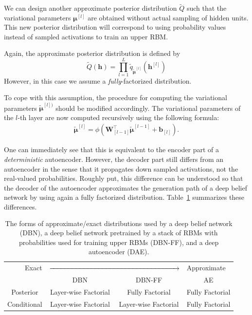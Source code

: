 \documentclass[dissertation,nocontribution,draft*]{aaltoseries}
\newcommand{\qlay}[1]{\left[#1\right]}
\newcommand{\vect}[1]{\mathbf{#1}}
\newcommand{\vects}[1]{\boldsymbol{#1}}
\newcommand{\matr}[1]{\mathbf{#1}}
\newcommand{\vb}[0]{\vect{b}}
\newcommand{\vh}[0]{\vect{h}}
\newcommand{\mW}[0]{\matr{W}}
\newcommand{\vmu}[0]{\vects{\mu}}
\begin{document}
We can design another approximate posterior distribution
$\tilde{Q}$ such that the variational parameters
$\vmu^{\qlay{l}}$ are obtained without actual sampling of hidden
units. This new posterior distribution will correspond to
using probability values instead of sampled activations to
train an upper RBM.

Again, the approximate posterior distribution is defined by
\[
\tilde{Q}(\vh) = \prod_{l=1}^L \tilde{q}_{\tilde{\vmu}^{\qlay{l}}}\left(
\vh^{\qlay{l}} \right)
\]
However, in this case we assume a \textit{fully}-factorized
distribution. 

To cope with this assumption, the procedure for computing
the variational parameters $\tilde{\vmu}^{\qlay{l})}$ should
be modified accordingly.  The variational parameters of the
$l$-th layer are now computed recursively using the
following formula: 
\begin{align}
    \label{eq:dbn_posterior_ff}
    \tilde{\vmu}^{\qlay{l}} = \phi\left( \mW_{\qlay{l-1}}^\top
    \tilde{\vmu}^{\qlay{l-1}} + \vb_{\qlay{l}} \right).
\end{align}

One can immediately see that this is equivalent to the
encoder part of a \textit{deterministic} autoencoder.
However, the decoder part still differs from an autoencoder
in the sense that it propagates down sampled activations,
not the real-valued probabilities.  Roughly put, this
difference can be understood so that the decoder of the
autoencoder approximates the generation path of a deep
belief network by using again a fully factorized distribution.
Table~\ref{tbl:dbn_ae} summarizes these differences.

\begin{table}[h]
\vskip 0.15in
    \centering
    \begin{tabular}{c || c | c | c}
        \multicolumn{1}{r}{Exact}&
        \multicolumn{2}{c}{$\xrightarrow{\hspace{6.5cm}}$} 
        & \multicolumn{1}{l}{Approximate} \\
        & DBN & DBN-FF & AE \\
        \hline
        \hline
        Posterior & Layer-wise Factorial & Fully Factorial & Fully Factorial \\
        \hline
        Conditional & Layer-wise Factorial & Layer-wise Factorial & Fully Factorial \\
    \end{tabular}
    \caption{The forms of approximate/exact 
    distributions used by a deep belief network (DBN), a
    deep belief network pretrained by a stack of RBMs with
    probabilities used for training upper RBMs (DBN-FF), and
    a deep autoencoder (DAE).}
    \label{tbl:dbn_ae}
\end{table}
\end{document}
